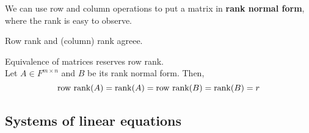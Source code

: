 \begin{remark}
    We can use row and column operations to put a matrix in \textbf{rank normal form}, where the rank is easy to observe.
\end{remark}

\begin{remark}
    Row rank and (column) rank agreee.
\end{remark}

\begin{remark}
    Equivalence of matrices reserves row rank. \\

    Let $A \in F^{m \times n}$  and $B$ be its rank normal form. Then, 
    \[
        \text{row rank} (A) = \rank (A) = \text{row rank} (B) = \rank(B) = r
    \]
\end{remark}

\subsection{Systems of linear equations}


